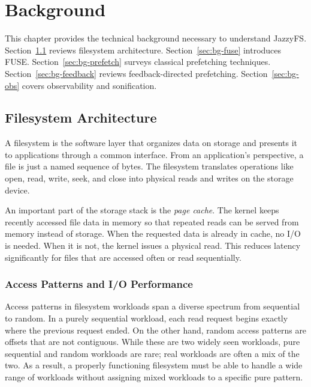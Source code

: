 \documentclass[12pt]{report}
\begin{document}
\chapter{Background}
\label{ch:background}

This chapter provides the technical background necessary to understand
JazzyFS.
Section~\ref{sec:bg-fs} reviews filesystem architecture.
Section~\ref{sec:bg-fuse} introduces FUSE.
Section~\ref{sec:bg-prefetch} surveys classical prefetching techniques.
Section~\ref{sec:bg-feedback} reviews feedback-directed prefetching.
Section~\ref{sec:bg-obs} covers observability and sonification.

\section{Filesystem Architecture}
\label{sec:bg-fs}

A filesystem is the software layer that organizes data on storage and
presents it to applications through a common interface. From an
application's perspective, a file is just a named sequence of bytes. The
filesystem translates operations like open, read, write, seek, and close
into physical reads and writes on the storage device.

An important part of the storage stack is the \emph{page cache}. The kernel
keeps recently accessed file data in memory so that repeated reads can be
served from memory instead of storage. When the requested data is already in
cache, no I/O is needed. When it is not, the kernel issues a physical read.
This reduces latency significantly for files that are accessed often or
read sequentially.

\subsection{Access Patterns and I/O Performance}

Access patterns in filesystem workloads span a diverse spectrum from
sequential to random. In a purely sequential workload, each read request
begins exactly where the previous request ended. On the other hand, random
access patterns are offsets that are not contiguous. While these are two
widely seen workloads, pure sequential and random workloads are rare; real
workloads are often a mix of the two. As a result, a properly functioning
filesystem must be able to handle a wide range of workloads without
assigning mixed workloads to a specific pure pattern.
\end{document}
